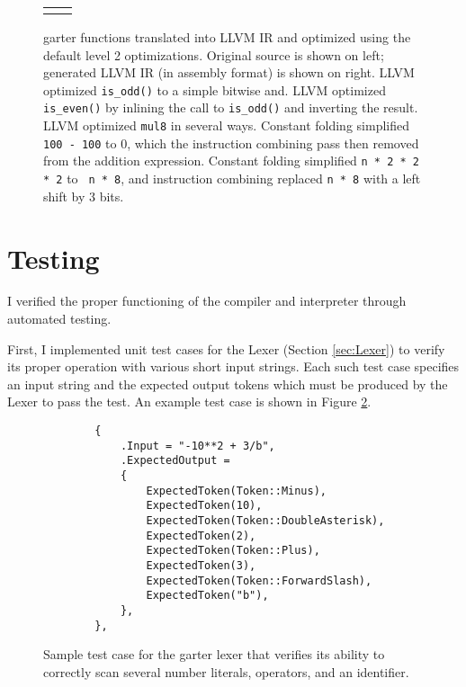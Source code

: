 \documentclass[11pt]{article}
\begin{document}
\begin{figure}
    \begin{tabular}{p{7cm}p{9cm}}
        
        &
        
    \end{tabular}
    \caption{garter functions translated into LLVM IR and optimized using the
            default level 2 optimizations.  Original source is shown on left;
            generated LLVM IR (in assembly format) is shown on right.  LLVM
            optimized {\tt is\_odd()} to a simple bitwise and.  LLVM optimized
            {\tt is\_even()} by inlining the call to {\tt is\_odd()} and
            inverting the result.  LLVM optimized {\tt mul8} in several ways.
            Constant folding simplified {\tt 100 - 100} to 0, which the
            instruction combining pass then removed from the addition
            expression.  Constant folding simplified {\tt n * 2 * 2 * 2} to {\tt
            n * 8}, and instruction combining replaced {\tt n * 8} with a left
            shift by 3 bits.
    }
    \label{fig:test}
\end{figure}

\section{Testing}

\label{sec:testing}

I verified the proper functioning of the compiler and interpreter through
automated testing.

First, I implemented unit test cases for the Lexer (Section \ref{sec:Lexer}) to
verify its proper operation with various short input strings.  Each such test
case specifies an input string and the expected output tokens which must be
produced by the Lexer to pass the test.  An example test case is shown in Figure
\ref{fig:TestLexer}.

\begin{figure}
    \lstset{language=C++}
    \begin{lstlisting}
        {
            .Input = "-10**2 + 3/b",
            .ExpectedOutput =
            {
                ExpectedToken(Token::Minus),
                ExpectedToken(10),
                ExpectedToken(Token::DoubleAsterisk),
                ExpectedToken(2),
                ExpectedToken(Token::Plus),
                ExpectedToken(3),
                ExpectedToken(Token::ForwardSlash),
                ExpectedToken("b"),
            },
        },
    \end{lstlisting}
    \caption{Sample test case for the garter lexer that verifies its ability to
        correctly scan several number literals, operators, and an identifier.}
    \label{fig:TestLexer}
\end{figure}
\end{document}
